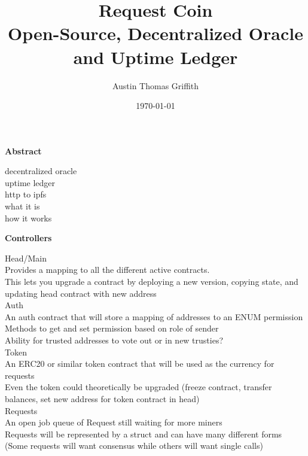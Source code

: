 \documentclass[a4paper,10pt]{article}
\begin{document}
\title{%
  Request Coin \\
  \medbreak
  \small  Open-Source, Decentralized Oracle and Uptime Ledger\\
     }

\date{\today}
\author{Austin Thomas Griffith}
\maketitle


\begin{center}
\textbf{Abstract}
\end{center}
decentralized oracle \\
uptime ledger \\
http to ipfs \\

what it is \\
how it works \\


\begin{center}
\textbf{Controllers}
\end{center}

Head/Main \\
Provides a mapping to all the different active contracts. \\
This lets you upgrade a contract by deploying a new version, copying state, and updating head contract with new address \\

Auth \\
An auth contract that will store a mapping of addresses to an ENUM permission \\
Methods to get and set permission based on role of sender \\
Ability for trusted addresses to vote out or in new trusties? \\

Token \\
An ERC20 or similar token contract that will be used as the currency for requests \\
Even the token could theoretically be upgraded (freeze contract, transfer balances, set new address for token contract in head) \\

Requests \\
An open job queue of Request still waiting for more miners \\
Requests will be represented by a struct and can have many different forms \\
(Some requests will want consensus while others will want single calls)
\end{document}
